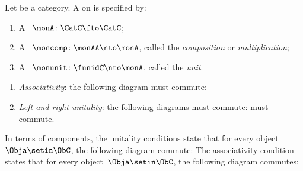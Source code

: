 \begin{ctdefinition}[Monad]
    \label{def:monad}
    Let \CatC be a category.
    A  on \CatC is specified by:\\
    \constit
    \begin{enumerate}
        \item A ~$ \monA \colon \CatC \fto \CatC$;
        \item A ~$\moncomp \colon \monAA \nto \monA$, called the \emph{composition} or \emph{multiplication};
        \item A ~$\monunit \colon \funidC \nto \monA$, called the \emph{unit}.
    \end{enumerate}
    \condit
    \begin{enumerate}
        \item \emph{Associativity}: the following diagram must commute:
        \item \emph{Left and right unitality}: the following diagrams must commute:
              must commute.
    \end{enumerate}
\end{ctdefinition}

\begin{remark}
    \label{rem:monad-condition-components}
    In terms of components, the unitality conditions state that for every object~$\Obja \setin \ObC$, the following diagram commute:
    The associativity condition states that for every object~$\Obja \setin \ObC$,
    the following diagram commutes:
\end{remark}



